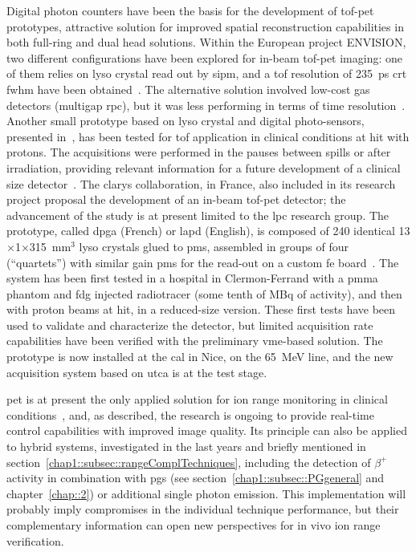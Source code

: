 Digital photon counters have been the basis for the development of \gls{tof}-\gls{pet} prototypes, attractive solution for improved spatial reconstruction capabilities in both full-ring and dual head solutions. Within the European project ENVISION, two different configurations have been explored for in-beam \gls{tof}-\gls{pet} imaging: one of them relies on \gls{lyso} crystal read out by \gls{sipm}, and a \gls{tof} resolution of 235~ps \gls{crt} \gls{fwhm} have been obtained~\parencite{Morrocchi2012}. The alternative solution involved low-cost gas detectors (multigap \gls{rpc}), but it was less performing in terms of time resolution~\parencite{Watts2013}. Another small prototype based on \gls{lyso} crystal and digital photo-sensors, presented in~\parencite{Degenhardt2012}, has been tested for \gls{tof} application in clinical conditions at \gls{hit} with protons. The acquisitions were performed in the pauses between spills or after irradiation, providing relevant information for a future development of a clinical size detector~\parencite{CambraiaLopes2016}.    
The \gls{clarys} collaboration, in France, also included in its research project proposal the development of an in-beam \gls{tof}-\gls{pet} detector; the advancement of the study is at present limited to the \gls{lpc} research group. The prototype, called \gls{dpga} (French) or \gls{lapd} (English), is composed of 240 identical 13$\times$1$\times$315~mm$^3$ \gls{lyso} crystals glued to \glspl{pm}, assembled in groups of four (\enquote{quartets}) with similar gain \glspl{pm} for the read-out on a custom \gls{fe} board~\parencite{Montarou2016}. The system has been first tested in a hospital in Clermon-Ferrand with a \gls{pmma} phantom and \gls{fdg} injected radiotracer (some tenth of MBq of activity), and then with proton beams at \gls{hit}, in a reduced-size version. These first tests have been used to validate and characterize the detector, but limited acquisition rate capabilities have been verified with the preliminary \gls{vme}-based solution. The prototype is now installed at the \gls{cal} in Nice, on the 65~MeV line, and the new acquisition system based on \gls{utca} is at the test stage.  

\gls{pet} is at present the only applied solution for ion range monitoring in clinical conditions~\parencite{Enghardt2004}, and, as described, the research is ongoing to provide real-time control capabilities with improved image quality. Its principle can also be applied to hybrid systems, investigated in the last years and briefly mentioned in section~\ref{chap1::subsec::rangeComplTechniques}, including the detection of $\beta^+$ activity in combination with \glspl{pg} (see section~\ref{chap1::subsec::PGgeneral} and chapter~\ref{chap::2}) or additional single photon emission. This implementation will probably imply compromises in the individual technique performance, but their complementary information can open new perspectives for in vivo ion range verification.   

